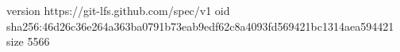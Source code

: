 version https://git-lfs.github.com/spec/v1
oid sha256:46d26c36e264a363ba0791b73eab9edf62c8a4093fd569421bc1314aea594421
size 5566
